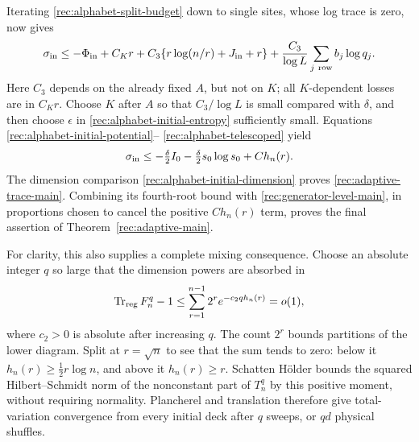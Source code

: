 Iterating \eqref{rec:alphabet-split-budget} down to single sites,
whose log trace is zero, now gives
\begin{equation}\label{rec:alphabet-telescoped}
 \sigma_{\rm in}\le-\Phi_{\rm in}+C_Kr+
 C_3\{r\log(n/r)+J_{\rm in}+r\}
 +\frac{C_3}{\log L}\sum_{j\ \mathrm{row}}b_j\log q_j.
\end{equation}
Here $C_3$ depends on the already fixed $A$, but not on $K$; all
$K$-dependent losses are in $C_Kr$.  Choose $K$ after $A$ so that
$C_3/\log L$ is small compared with
$\delta$, and then choose $\epsilon$ in
\eqref{rec:alphabet-initial-entropy} sufficiently small.
Equations \eqref{rec:alphabet-initial-potential}--
\eqref{rec:alphabet-telescoped} yield
\[
 \sigma_{\rm in}\le
 -\tfrac\delta2 I_0-\tfrac\delta2s_0\log s_0+C h_n(r).
\]
The dimension comparison \eqref{rec:alphabet-initial-dimension}
proves \eqref{rec:adaptive-trace-main}.  Combining its fourth-root
bound with \eqref{rec:generator-level-main}, in proportions chosen
to cancel the positive $C h_n(r)$ term, proves the final assertion
of Theorem~\ref{rec:adaptive-main}.

For clarity, this also supplies a complete mixing consequence.  Choose an
absolute integer $q$ so large that the dimension powers are absorbed in
\[
 \operatorname{Tr}_{\rm reg}F_n^q-1
 \le\sum_{r=1}^{n-1}2^r e^{-c_2q h_n(r)}=o(1),
\]
where $c_2>0$ is absolute after increasing $q$.  The count $2^r$
bounds partitions of the lower diagram.  Split at $r=\sqrt n$ to see
that the sum tends to zero: below it $h_n(r)\ge\frac12r\log n$,
and above it $h_n(r)\ge r$.  Schatten H\"older bounds the squared
Hilbert--Schmidt norm of the nonconstant part of $T_n^q$ by this
positive moment, without requiring normality.  Plancherel and translation
therefore give total-variation convergence from every initial deck after
$q$ sweeps, or $qd$ physical shuffles.

